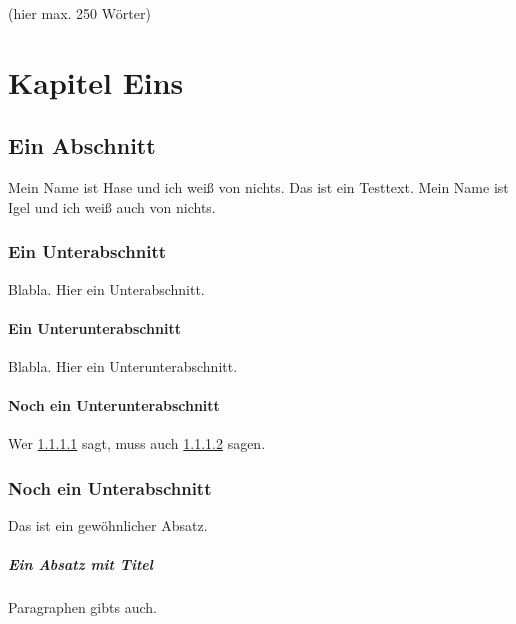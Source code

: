 \documentclass[11pt,a4paper,twoside,openright]{scrbook}
\begin{document}
\deckblatt

\pagestyle{scrheadings}

\erklaerung

\thispagestyle{scrplain}
\noindent

(hier max. 250 Wörter)


\tableofcontents


\chapter{Kapitel Eins}

\section{Ein Abschnitt}
Mein Name ist Hase und ich weiß von nichts. Das ist ein Testtext. Mein Name ist
Igel und ich weiß auch von nichts.

\subsection{Ein Unterabschnitt}
Blabla. Hier ein Unterabschnitt.

\subsubsection{Ein Unterunterabschnitt}
\label{sec:a}
Blabla. Hier ein Unterunterabschnitt.

\subsubsection{Noch ein Unterunterabschnitt}
\label{sec:b}

Wer \ref{sec:a} sagt, muss auch \ref{sec:b} sagen.

\subsection{Noch ein Unterabschnitt}

Das ist ein gewöhnlicher Absatz.

\paragraph{Ein Absatz mit Titel}
Paragraphen gibts auch.
\end{document}
